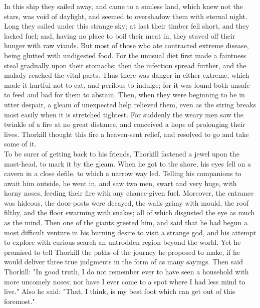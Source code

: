 \documentclass[10pt,a4paper]{report}
\begin{document}
In this ship they sailed away, and came to a sunless land, which knew not the stars, was void of daylight, and seemed to overshadow them with eternal night. Long they sailed under this strange sky; at last their timber fell short, and they lacked fuel; and, having no place to boil their meat in, they staved off their hunger with raw viands. But most of those who ate contracted extreme disease, being glutted with undigested food. For the unusual diet first made a faintness steal gradually upon their stomachs; then the infection spread further, and the malady reached the vital parts. Thus there was danger in either extreme, which made it hurtful not to eat, and perilous to indulge; for it was found both unsafe to feed and bad for them to abstain. Then, when they were beginning to be in utter despair, a gleam of unexpected help relieved them, even as the string breaks most easily when it is stretched tightest. For suddenly the weary men saw the twinkle of a fire at no great distance, and conceived a hope of prolonging their lives. Thorkill thought this fire a heaven-sent relief, and resolved to go and take some of it.\\

To be surer of getting back to his friends, Thorkill fastened a jewel upon the mast-head, to mark it by the gleam. When he got to the shore, his eyes fell on a cavern in a close defile, to which a narrow way led. Telling his companions to await him outside, he went in, and saw two men, swart and very huge, with horny noses, feeding their fire with any chance-given fuel. Moreover, the entrance was hideous, the door-posts were decayed, the walls grimy with mould, the roof filthy, and the floor swarming with snakes; all of which disgusted the eye as much as the mind. Then one of the giants greeted him, and said that he had begun a most difficult venture in his burning desire to visit a strange god, and his attempt to explore with curious search an untrodden region beyond the world. Yet he promised to tell Thorkill the paths of the journey he proposed to make, if he would deliver three true judgments in the form of as many sayings. Then said Thorkill: "In good truth, I do not remember ever to have seen a household with more uncomely noses; nor have I ever come to a spot where I had less mind to live." Also he said: "That, I think, is my best foot which can get out of this foremost."\\
\end{document}
